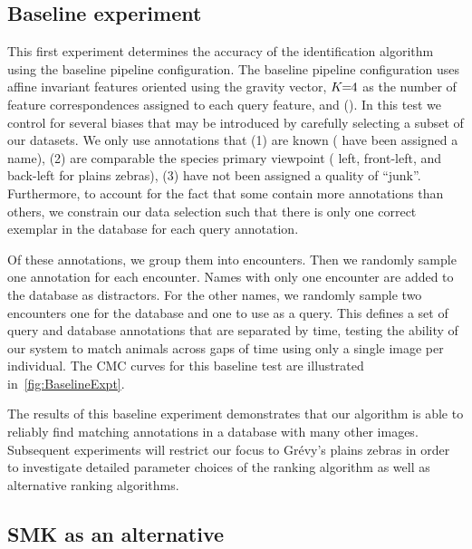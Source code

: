     \subsection{Baseline experiment}\label{sub:exptbase}
      
        \BaselineExpt{}

        This first experiment determines the accuracy of the identification algorithm using the baseline pipeline
          configuration.
        The baseline pipeline configuration uses affine invariant features oriented using the gravity vector,
          $K\mkern-6mu=\mkern-6mu4$ as the number of feature correspondences assigned to each query feature, and \nscoring{}
          (\nsum{}).
        In this test we control for several biases that may be introduced by carefully selecting a subset of our
          datasets.
        We only use annotations that
        (1) are known (\ie{} have been assigned a name),
        (2) are comparable the species primary viewpoint (\eg{} left, front-left, and back-left for plains
          zebras),
        (3) have not been assigned a quality of ``junk''.
        Furthermore, to account for the fact that some \names{} contain more annotations than others, we
          constrain our data selection such that there is only one correct exemplar in the database for each query
          annotation.

        Of these annotations, we group them into encounters.
        Then we randomly sample one annotation for each encounter.
        Names with only one encounter are added to the database as distractors.
        For the other names, we randomly sample two encounters one for the database and one to use as a query.
        This defines a set of query and database annotations that are separated by time, testing the ability of
          our system to match animals across gaps of time using only a single image per individual.
        The CMC curves for this baseline test are illustrated in~\cref{fig:BaselineExpt}.

        The results of this baseline experiment demonstrates that our algorithm is able to reliably find matching
          annotations in a database with many other images.
        Subsequent experiments will restrict our focus to Grévy's plains zebras in order to investigate detailed
          parameter choices of the ranking algorithm as well as alternative ranking algorithms.

    \subsection{SMK as an alternative}\label{sub:exptsmk}  

